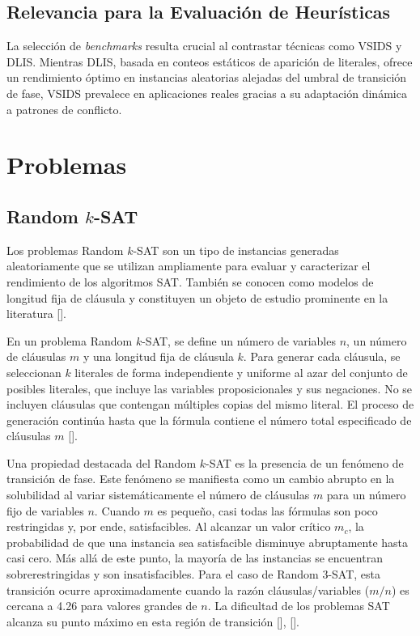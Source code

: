 \subsection{Relevancia para la Evaluación de Heurísticas}
La selección de \textit{benchmarks} resulta crucial al contrastar técnicas como VSIDS y DLIS. Mientras DLIS, basada en conteos estáticos de aparición de literales, ofrece un rendimiento óptimo en instancias aleatorias alejadas del umbral de transición de fase, VSIDS prevalece en aplicaciones reales gracias a su adaptación dinámica a patrones de conflicto.

\section{Problemas}
\label{sec:problemas-ej}

\subsection{Random $k$-SAT}
\label{subsec:random-k-sat}
Los problemas Random $k$-SAT son un tipo de instancias generadas aleatoriamente que se utilizan ampliamente para evaluar y caracterizar el rendimiento de los algoritmos SAT. También se conocen como modelos de longitud fija de cláusula y constituyen un objeto de estudio prominente en la literatura [\cite{hoos1998sat}]. %

En un problema Random $k$-SAT, se define un número de variables $n$, un número de cláusulas $m$ y una longitud fija de cláusula $k$. Para generar cada cláusula, se seleccionan $k$ literales de forma independiente y uniforme al azar del conjunto de posibles literales, que incluye las variables proposicionales y sus negaciones. No se incluyen cláusulas que contengan múltiples copias del mismo literal. El proceso de generación continúa hasta que la fórmula contiene el número total especificado de cláusulas $m$ [\cite{hoos1998sat}]. %

Una propiedad destacada del Random $k$-SAT es la presencia de un fenómeno de transición de fase. Este fenómeno se manifiesta como un cambio abrupto en la solubilidad al variar sistemáticamente el número de cláusulas $m$ para un número fijo de variables $n$. Cuando $m$ es pequeño, casi todas las fórmulas son poco restringidas y, por ende, satisfacibles. Al alcanzar un valor crítico $m_c$, la probabilidad de que una instancia sea satisfacible disminuye abruptamente hasta casi cero. Más allá de este punto, la mayoría de las instancias se encuentran sobre\-restringidas y son insatisfacibles. Para el caso de Random 3-SAT, esta transición ocurre aproximadamente cuando la razón cláusulas/variables ($m/n$) es cercana a 4.26 para valores grandes de $n$. La dificultad de los problemas SAT alcanza su punto máximo en esta región de transición [\cite{hoos1998sat}], [\cite{ganesh_unreasonable}]. %

